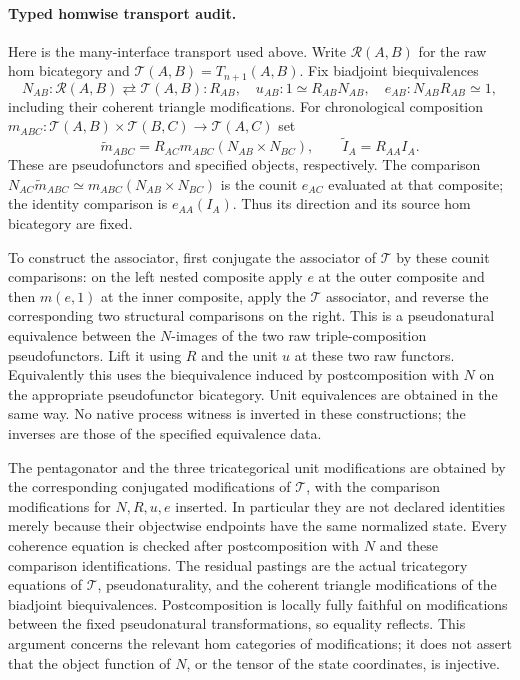 \documentclass{article}
\begin{document}
\paragraph{Typed homwise transport audit.}
Here is the many-interface transport used above. Write $\mathcal R(A,B)$ for the raw hom bicategory and $\mathcal T(A,B)=T_{n+1}(A,B)$. Fix biadjoint biequivalences
\[
 N_{AB}:\mathcal R(A,B)\rightleftarrows\mathcal T(A,B):R_{AB},
 \quad u_{AB}:1\simeq R_{AB}N_{AB},\quad
 e_{AB}:N_{AB}R_{AB}\simeq1,
\]
including their coherent triangle modifications. For chronological composition
$m_{ABC}:\mathcal T(A,B)\times\mathcal T(B,C)\to\mathcal T(A,C)$ set
\[
 \widetilde m_{ABC}=R_{AC}m_{ABC}(N_{AB}\times N_{BC}),
 \qquad\widetilde I_A=R_{AA}I_A.
\]
These are pseudofunctors and specified objects, respectively. The comparison
$N_{AC}\widetilde m_{ABC}\simeq m_{ABC}(N_{AB}\times N_{BC})$
is the counit $e_{AC}$ evaluated at that composite; the identity comparison is $e_{AA}(I_A)$. Thus its direction and its source hom bicategory are fixed.

To construct the associator, first conjugate the associator of $\mathcal T$ by these counit comparisons: on the left nested composite apply $e$ at the outer composite and then $m(e,1)$ at the inner composite, apply the $\mathcal T$ associator, and reverse the corresponding two structural comparisons on the right. This is a pseudonatural equivalence between the $N$-images of the two raw triple-composition pseudofunctors. Lift it using $R$ and the unit $u$ at these two raw functors. Equivalently this uses the biequivalence induced by postcomposition with $N$ on the appropriate pseudofunctor bicategory. Unit equivalences are obtained in the same way. No native process witness is inverted in these constructions; the inverses are those of the specified equivalence data.

The pentagonator and the three tricategorical unit modifications are obtained by the corresponding conjugated modifications of $\mathcal T$, with the comparison modifications for $N,R,u,e$ inserted. In particular they are not declared identities merely because their objectwise endpoints have the same normalized state. Every coherence equation is checked after postcomposition with $N$ and these comparison identifications. The residual pastings are the actual tricategory equations of $\mathcal T$, pseudonaturality, and the coherent triangle modifications of the biadjoint biequivalences. Postcomposition is locally fully faithful on modifications between the fixed pseudonatural transformations, so equality reflects. This argument concerns the relevant hom categories of modifications; it does not assert that the object function of $N$, or the tensor of the state coordinates, is injective.
\end{document}
